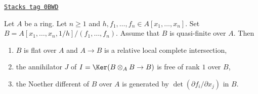 \begin{lemma}
\label{discriminant-lemma-quasi-finite-complete-intersection}
\href{https://stacks.math.columbia.edu/tag/0BWD}{\texttt{Stacks tag 0BWD}}

Let $A$ be a ring. Let $n \geq 1$ and
$h, f_1, \ldots, f_n \in A[x_1, \ldots, x_n]$.
Set $B = A[x_1, \ldots, x_n, 1/h]/(f_1, \ldots, f_n)$.
Assume that $B$ is quasi-finite over $A$.
Then
\begin{enumerate}
\item $B$ is flat over $A$ and $A \to B$ is a relative local complete
intersection,
\item the annihilator $J$ of $I = \Ker(B \otimes_A B \to B)$
is free of rank $1$ over $B$,
\item the Noether different of $B$ over $A$ is generated
by $\det(\partial f_i/\partial x_j)$ in $B$.
\end{enumerate}
\end{lemma}

